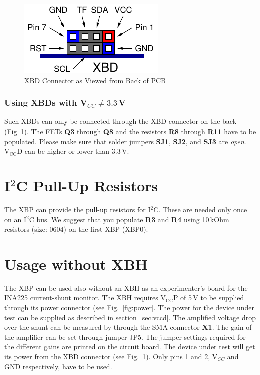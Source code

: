 \documentclass[twoside,11pt]{cergdoc}
\begin{document}
\begin{figure}[ht]
  \begin{center}
    \includegraphics[scale=1]{figures/xbd_connector}
    \caption{XBD Connector as Viewed from Back of PCB}\label{fig:xbd}
  \end{center}
\vspace{-1ex}
\end{figure}

\subsubsection{Using XBDs with V$_{CC} \not= 3.3$\,V}
Such XBDs can only be connected through the XBD connector on the back (Fig~\ref{fig:xbd}).
The FETs \textbf{Q3} through \textbf{Q8} and the resistors \textbf{R8}  through \textbf{R11}
 have to be populated.
Please make sure that solder jumpers \textbf{SJ1}, \textbf{SJ2}, and \textbf{SJ3} 
are \emph{open}. $\mathrm{V_{CC}D}$ can be higher or lower than 3.3\,V.

\section{I$^2$C Pull-Up Resistors}\label{sec:i2cr}
The XBP can provide the pull-up resistors for I$^2$C. These are needed only once on an 
I$^2$C bus. We suggest that you populate \textbf{R3} and \textbf{R4} using 
10\,kOhm resistors (size: 0604) on the first XBP (XBP0).

\section{Usage without XBH}\label{sec:noXBH}
The XBP can be used also without an XBH as an experimenter's board for the INA225 
current-shunt monitor. The XBH requires $\mathrm{V_{CC}P}$ of 5\,V to be supplied
through its power connector (see Fig.~\ref{fig:power}. The power for the device 
under test can be supplied as described in section~\ref{sec:vccd}. The amplified
voltage drop over the shunt can be measured by through the SMA connector \textbf{X1}.
The gain of the amplifier can be set through jumper JP5. The jumper settings required
for the different gains are printed on the circuit board. The device under test will
get its power from the XBD connector (see Fig.~\ref{fig:xbd}). Only pins 1 and 2,
V$_{CC}$ and GND respectively, have to be used.
\end{document}
